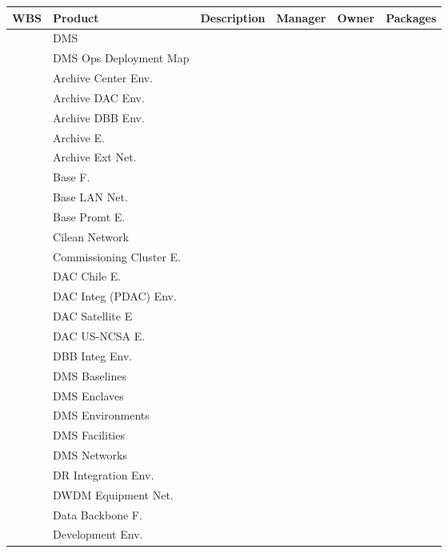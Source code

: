 

\tiny
\begin{longtable}{|p{}|p{}|p{}|p{}|p{}|p{}|}\hline
\textbf{WBS} & Product & Description & Manager & Owner & Packages\\ \hline
 &  DMS &  &  &  & \\ \hline
 &  DMS Ops Deployment Map &  &  &  & \\ \hline
 &  Archive Center Env. &  &  &  & \\ \hline
 &  Archive DAC Env. &  &  &  & \\ \hline
 &  Archive DBB Env. &  &  &  & \\ \hline
 &  Archive E. &  &  &  & \\ \hline
 &  Archive Ext Net. &  &  &  & \\ \hline
 &  Base F. &  &  &  & \\ \hline
 &  Base LAN Net. &  &  &  & \\ \hline
 &  Base Promt E. &  &  &  & \\ \hline
 &  Cilean Network &  &  &  & \\ \hline
 &  Commissioning Cluster E. &  &  &  & \\ \hline
 &  DAC Chile E. &  &  &  & \\ \hline
 &  DAC Integ  (PDAC) Env. &  &  &  & \\ \hline
 &  DAC Satellite E &  &  &  & \\ \hline
 &  DAC US-NCSA E. &  &  &  & \\ \hline
 &  DBB Integ Env. &  &  &  & \\ \hline
 &  DMS Baselines &  &  &  & \\ \hline
 &  DMS Enclaves &  &  &  & \\ \hline
 &  DMS Environments &  &  &  & \\ \hline
 &  DMS Facilities &  &  &  & \\ \hline
 &  DMS Networks &  &  &  & \\ \hline
 &  DR Integration Env. &  &  &  & \\ \hline
 &  DWDM Equipment Net. &  &  &  & \\ \hline
 &  Data Backbone F. &  &  &  & \\ \hline
 &  Development Env. &  &  &  & \\ \hline

\end{longtable}
